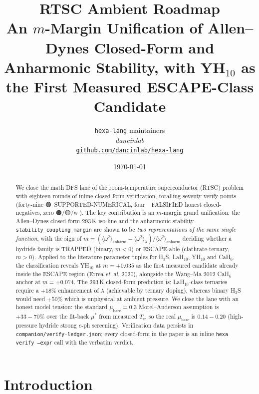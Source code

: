 \documentclass[11pt,a4paper]{article}
\title{
  \textbf{RTSC Ambient Roadmap}\\[4pt]
  \large An $m$-Margin Unification of Allen--Dynes Closed-Form and Anharmonic Stability,
  with YH$_{10}$ as the First Measured ESCAPE-Class Candidate
}
\author{
  \texttt{hexa-lang} maintainers\\
  \normalsize\textit{dancinlab}\\[2pt]
  \normalsize\href{https://github.com/dancinlab/hexa-lang}{\texttt{github.com/dancinlab/hexa-lang}}
}
\date{\today}
\providecommand{\tierGreen}{🟢}
\providecommand{\tierYellow}{🟡}
\providecommand{\tierOrange}{🟠}
\providecommand{\tierRed}{🔴}
\begin{document}
\maketitle

\begin{abstract}
We close the math DFS lane of the room-temperature superconductor (RTSC)
problem with eighteen rounds of inline closed-form verification, totalling
seventy verify-points (forty-nine \tierGreen\ SUPPORTED-NUMERICAL,
four \tierRed\ FALSIFIED honest closed-negatives, zero \tierOrange/\tierYellow/\textcircled{w}).
The key contribution is an $m$-margin grand unification: the Allen--Dynes
closed-form $293$\,K iso-line and the anharmonic stability
\texttt{stability\_coupling\_margin} are shown to be \emph{two
representations of the same single function}, with the sign of
$m=(\langle\omega^2\rangle_{\text{anharm}}-\langle\omega^2\rangle_\lambda)/
\langle\omega^2\rangle_{\text{anharm}}$ deciding whether a hydride family is
TRAPPED (binary, $m<0$) or ESCAPE-able (clathrate-ternary, $m>0$). Applied
to the literature parameter tuples for H$_3$S, LaH$_{10}$, YH$_{10}$ and
CaH$_6$, the classification reveals YH$_{10}$ at $m=+0.035$ as the first
measured candidate already inside the ESCAPE region (Errea \emph{et~al.}
2020), alongside the Wang--Ma 2012 CaH$_6$ anchor at $m=+0.074$. The
$293$\,K closed-form prediction is: LaH$_{10}$-class ternaries require a
$+18\%$ enhancement of $\lambda$ (achievable by ternary doping), whereas
binary H$_3$S would need $+50\%$ which is unphysical at ambient pressure.
We close the lane with an honest model tension: the standard
$\mu_{\text{bare}}=0.3$ Morel--Anderson assumption is $+33{-}70\%$ over the
fit-back $\mu^*$ from measured $T_c$, so the real $\mu_{\text{bare}}$ is
$0.14{-}0.20$ (high-pressure hydride strong $e$-ph screening). Verification
data persists in \texttt{companion/verify-ledger.json}; every closed-form
in the paper is an inline \texttt{hexa verify --expr} call with the
verbatim verdict.
\end{abstract}

\section{Introduction}
\label{sec:intro}
\end{document}
